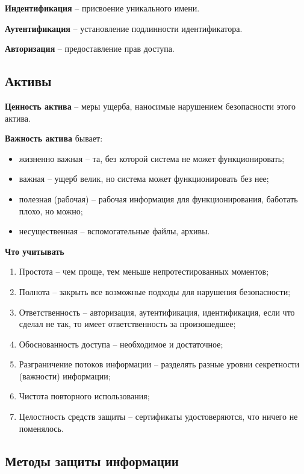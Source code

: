 \textbf{Индентификация} -- присвоение уникального имени.

\textbf{Аутентификация} -- установление подлинности идентификатора.

\textbf{Авторизация} -- предоставление прав доступа.

\subsection{Активы}

\textbf{Ценность актива} -- меры ущерба, наносимые нарушением безопасности этого актива.

\textbf{Важность актива} бывает:

\begin{itemize}
    \item жизненно важная -- та, без которой система не может функционировать;
    \item важная -- ущерб велик, но система может функционировать без нее;
    \item полезная (рабочая) -- рабочая информация для функционирования, баботать плохо, но можно;
    \item несущественная -- вспомогательные файлы, архивы.
\end{itemize}

\textbf{Что учитывать}

\begin{enumerate}
    \item Простота -- чем проще, тем меньше непротестированных моментов;
    \item Полнота -- закрыть все возможные подходы для нарушения безопасности;
    \item Ответственность -- авторизация, аутентификация, идентификация, если что сделал не так, то имеет ответственность за произошедшее;
    \item Обоснованность доступа -- необходимое и достаточное;
    \item Разграничение потоков информации -- разделять разные уровни секретности (важности) информации;
    \item Чистота повторного использования;
    \item Целостность средств защиты -- сертификаты удостоверяются, что ничего не поменялось.
\end{enumerate}

\subsection{Методы защиты информации}

